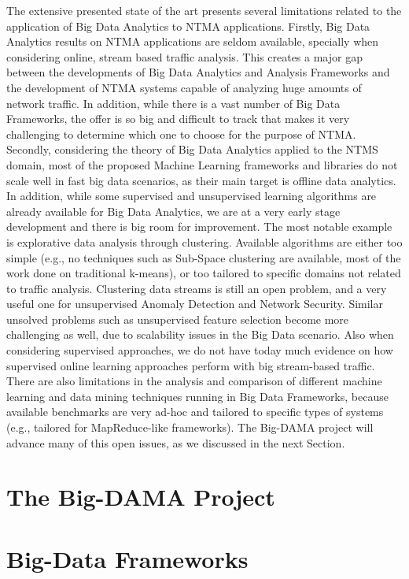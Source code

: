 \documentclass[10pt, conference, letterpaper]{IEEEtran}
\begin{document}
The extensive presented state of the art presents several limitations related to the application of Big Data Analytics to NTMA applications. Firstly, Big Data Analytics results on NTMA applications are seldom available, specially when considering online, stream based traffic analysis. This creates a major gap between the developments of Big Data Analytics and Analysis Frameworks and the development of NTMA systems capable of analyzing huge amounts of network traffic. In addition, while there is a vast number of Big Data Frameworks, the offer is so big and difficult to track that makes it very challenging to determine which one to choose for the purpose of NTMA. Secondly, considering the theory of Big Data Analytics applied to the NTMS domain, most of the proposed Machine Learning frameworks and libraries do not scale well in fast big data scenarios, as their main target is offline data analytics. In addition, while some supervised and unsupervised learning algorithms are already available for Big Data Analytics, we are at a very early stage development and there is big room for improvement. The most notable example is explorative data analysis through clustering. Available algorithms are either too simple (e.g., no techniques such as Sub-Space clustering are available, most of the work done on traditional k-means), or too tailored to specific domains not related to traffic analysis. Clustering data streams is still an open problem, and a very useful one for unsupervised Anomaly Detection and Network Security. Similar unsolved problems such as unsupervised feature selection become more challenging as well, due to scalability issues in the Big Data scenario. Also when considering supervised approaches, we do not have today much evidence on how supervised online learning approaches perform with big stream-based traffic. There are also limitations in the analysis and comparison of different machine learning and data mining techniques running in Big Data Frameworks, because available benchmarks are very ad-hoc and tailored to specific types of systems (e.g., tailored for MapReduce-like frameworks). The Big-DAMA project will advance many of this open issues, as we discussed in the next Section.

\section{The Big-DAMA Project}\label{sectionIII}
\section{Big-Data Frameworks}\label{sectionIV}
\end{document}
